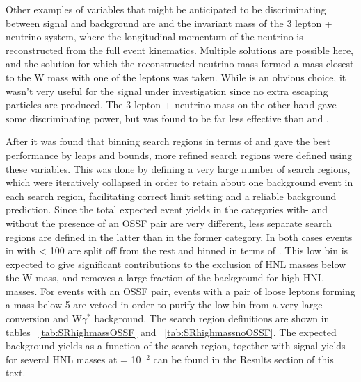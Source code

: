 Other examples of variables that might be anticipated to be
discriminating between signal and background are \met and the
invariant mass of the 3 lepton + neutrino system, where the
longitudinal momentum of the neutrino is reconstructed from the full
event kinematics. Multiple solutions are possible here, and the
solution for which the reconstructed neutrino mass formed a mass
closest to the W mass with one of the leptons was taken. While \met is
an obvious choice, it wasn't very useful for the signal under
investigation since no extra escaping particles are produced. The 3
lepton + neutrino mass on the other hand gave some discriminating
power, but was found to be far less effective than \mtmin and \mmin.

After it was found that binning search regions in terms of \mtmin and \mmin gave the best performance by leaps and bounds, more refined search regions were defined using these variables. This was done by defining a very large number of search regions, which were iteratively collapsed in order to retain about one background event in each search region, facilitating correct limit setting and a reliable background prediction. Since the total expected event yields in the categories with- and without the presence of an OSSF pair are very different, less separate search regions are defined in the latter than in the former category. In both cases events in with \mlll < 100 \GeV are split off from the rest and binned in terms of \mtmin . This low \mlll bin is expected to give significant contributions to the exclusion of HNL masses below the W mass, and removes a large fraction of the background for high HNL masses. For events with an OSSF pair, events with a pair of loose leptons forming a mass below 5 \GeV are vetoed in order to purify the low \mlll bin from a very large conversion and W$\gamma^{*}$ background. The search region definitions are shown in tables ~\ref{tab:SRhighmassOSSF} and ~\ref{tab:SRhighmassnoOSSF}. The expected background yields as a function of the search region, together with signal yields for several HNL masses at \mixpar = 10$^{-2}$ can be found in the Results section of this text.


